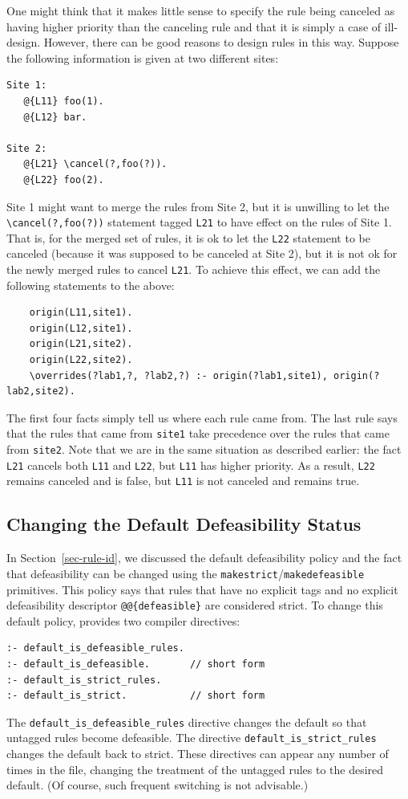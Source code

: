 \documentclass[11pt]{article}
\newcommand{\ERGO}{\mbox{\smaller{\ensuremath{\cal{E}}\smaller{{\sc{RGO}}}}}\xspace}
\newcommand{\FLSYSTEM}{\ERGO}
\newcommand{\bs}{\textbackslash}
\begin{document}
One might think that it makes little sense to specify the rule being
canceled as having higher priority than the canceling rule and that it is
simply a case of ill-design. However, there can be good reasons to design
rules in this way. Suppose the following information is given at two different sites:
\begin{verbatim}
Site 1:
   @{L11} foo(1).
   @{L12} bar.

Site 2:
   @{L21} \cancel(?,foo(?)).  
   @{L22} foo(2).
\end{verbatim}
Site 1 might want to merge the rules from Site 2, but it is unwilling to
let the {\tt \bs{}cancel(?,foo(?))} statement tagged {\tt L21} to have effect
on the rules of Site 1. That is, for the merged set of rules, it is ok to
let the {\tt L22} statement to be canceled (because it was supposed to be
canceled at Site 2), but it is not ok for the newly merged rules to cancel
{\tt L21}. To achieve this effect, we can add the following statements to
the above:
\begin{verbatim}
    origin(L11,site1).
    origin(L12,site1).
    origin(L21,site2).
    origin(L22,site2).
    \overrides(?lab1,?, ?lab2,?) :- origin(?lab1,site1), origin(?lab2,site2).
\end{verbatim}
The first four facts simply tell us where each rule came from.  The
last rule says that the rules that came from {\tt site1} take precedence
over the rules that came from {\tt site2}.  Note that we are in the same
situation as described earlier: the fact {\tt L21} cancels both {\tt L11}
and {\tt L22}, but {\tt L11} has higher priority. As a result, {\tt L22}
remains canceled and is false, but {\tt L11} is not canceled and remains
true.

\subsection{Changing  the Default Defeasibility Status}

In Section~\ref{sec-rule-id}, we discussed the default
defeasibility policy and the fact that defeasibility can be changed using
the \texttt{makestrict}/\texttt{makedefeasible} primitives.  
This policy says that rules that have no explicit tags and no explicit
defeasibility descriptor \texttt{@@\{defeasible\}}  are considered strict. To change this default
policy, \FLSYSTEM provides two compiler directives:
\begin{verbatim}
:- default_is_defeasible_rules.
:- default_is_defeasible.       // short form
:- default_is_strict_rules.
:- default_is_strict.           // short form
\end{verbatim}
The \verb|default_is_defeasible_rules| directive changes the default so
that untagged rules become defeasible. The directive
\verb|default_is_strict_rules| changes the default back to strict.
These directives can appear any number of times in the file,
changing the treatment of the untagged rules to the desired default.
(Of course, such frequent switching is not advisable.)
\end{document}
